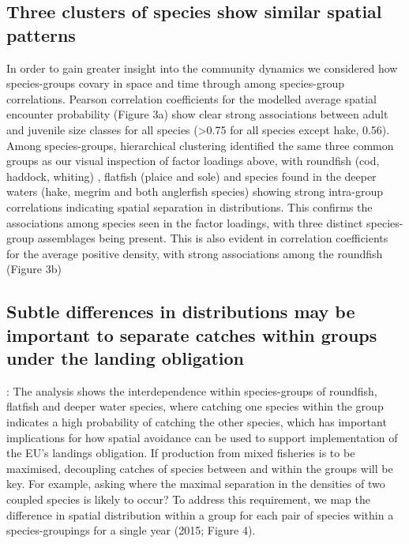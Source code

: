 \documentclass{nature}
\begin{document}
\subsection{Three clusters of species show similar spatial patterns} In order to
gain greater insight into the community dynamics we considered how
species-groups covary in space and time through among species-group
correlations. Pearson correlation coefficients for the modelled average spatial
encounter probability (Figure 3a) show clear strong associations between adult
and juvenile size classes for all species (\textgreater 0.75 for all species
except hake, 0.56).  Among species-groups, hierarchical clustering identified
the same three common groups as our visual inspection of factor loadings above,
with roundfish (cod, haddock, whiting) , flatfish (plaice and sole) 
and species found in the deeper waters (hake, megrim and both anglerfish species)
 showing strong intra-group
correlations indicating spatial separation
in distributions. This confirms the associations among species seen in the
factor loadings, with three distinct species-group assemblages being present.
This is also evident in correlation coefficients for the average positive
density, with strong associations among the roundfish (Figure 3b) 




\subsection{Subtle differences in distributions may be important to separate
	catches within groups under the landing obligation}: The analysis shows
the interdependence within species-groups of roundfish, flatfish and deeper
water species, where catching one species within the group indicates a high
probability of catching the other species, which has important implications for
how spatial avoidance can be used to support implementation of the EU's
landings obligation. If production from mixed fisheries is to be maximised,
decoupling catches of species between and within the groups will be key. For
example, asking where the maximal separation in the densities of two coupled
species is likely to occur? To address this requirement, we map the difference
in spatial distribution within a group for each pair of species within a
species-groupings for a single year (2015; Figure 4). 
\end{document}
